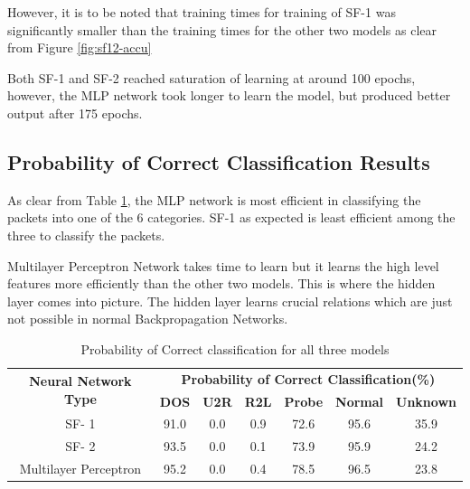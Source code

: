\documentclass[12pt]{article}
\theoremstyle{definition}
\begin{document}
		However, it is to be noted that training times for training of SF-1 was significantly smaller than the training times for the other two models as clear from Figure \ref{fig:sf12-accu}
		
		Both SF-1 and SF-2 reached saturation of learning at around 100 epochs, however, the MLP network took longer to learn the model, but produced better output after 175 epochs.
		
		
		\subsection{Probability of Correct Classification Results}
		As clear from Table \ref{tab:pcc-results}, the MLP network is most efficient in classifying the packets into one of the 6 categories. SF-1 as expected is least efficient among the three to classify the packets.
		
		Multilayer Perceptron Network takes time to learn but it learns the high level features more efficiently than the other two models. This is where the hidden layer comes into picture. The hidden layer learns crucial relations which are just not possible in normal Backpropagation Networks.
		
		\begin{table}[!h]
			\centering
			\caption{Probability of Correct classification for all three models }
			\label{tab:pcc-results}
			\begin{tabular}{|c|c|c|c|c|c|c|}
				\hline
				\multirow{2}{*}{\textbf{Neural Network Type}} & \multicolumn{6}{c|}{\textbf{Probability of Correct Classification(\%)}}                          \\ \cline{2-7} 
				& \textbf{DOS} & \textbf{U2R} & \textbf{R2L} & \textbf{Probe} & \textbf{Normal} & \textbf{Unknown} \\ \hline
				SF- 1                             & 91.0         & 0.0          & 0.9          & 72.6           & 95.6            & 35.9        \\     
				SF- 2                              & 93.5         & 0.0          & 0.1          & 73.9           & 95.9            & 24.2      \\       
				Multilayer Perceptron             & 95.2         & 0.0          & 0.4          & 78.5           & 96.5            & 23.8    \\    \hline     
			\end{tabular}
		\end{table}
		
\end{document}
